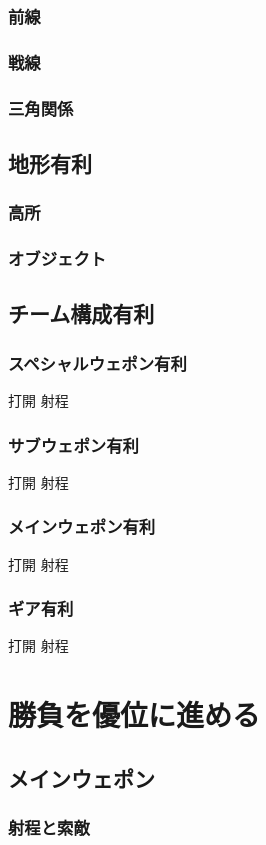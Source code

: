 \documentclass[a4paper,11pt]{jsbook}
\begin{document}
\section{前線}
\section{戦線}
\section{三角関係}
\chapter{地形有利}
\section{高所}
\section{オブジェクト}
\chapter{チーム構成有利}
\section{スペシャルウェポン有利}
打開
射程
\section{サブウェポン有利}
打開
射程
\section{メインウェポン有利}
打開
射程
\section{ギア有利}
打開
射程

\part{勝負を優位に進める}
\chapter{メインウェポン}
\section{射程と索敵}
\end{document}

